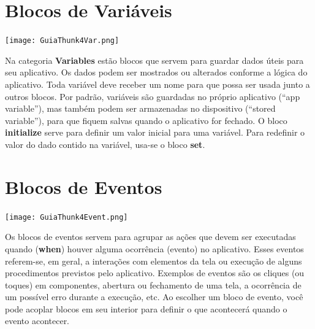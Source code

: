\documentclass[11pt,fleqn]{book} %
\begin{document}
\section{Blocos de Variáveis}

\begin{minipage}{0.5\textwidth}
	\texttt{[image: GuiaThunk4Var.png]}
\end{minipage}
\hfill
\begin{minipage}{0.45\textwidth}\raggedright
	Na categoria \textbf{Variables} estão blocos que servem para guardar dados úteis para seu aplicativo. Os dados podem ser mostrados ou alterados conforme a lógica do aplicativo. Toda variável deve receber um nome para que possa ser usada junto a outros blocos.
	Por padrão, variáveis são guardadas no próprio aplicativo (``app variable''), mas também podem ser armazenadas no dispositivo (``stored variable''), para que fiquem salvas quando o aplicativo for fechado.
	O bloco \textbf{initialize} serve para definir um valor
	inicial para uma variável. Para redefinir o valor do dado
	contido na variável, usa-se o bloco \textbf{set}. 
\end{minipage}


\section{Blocos de Eventos}

\begin{minipage}{0.5\textwidth}
	\texttt{[image: GuiaThunk4Event.png]}
\end{minipage}
\hfill
\begin{minipage}{0.45\textwidth}\raggedright
	Os blocos de eventos servem para agrupar as ações que devem ser executadas quando (\textbf{when}) houver alguma ocorrência (evento) no aplicativo. Esses eventos referem-se,
	em geral, a interações com elementos da tela ou execução
	de alguns procedimentos previstos pelo aplicativo.
	Exemplos de eventos são os cliques (ou toques) em 
	componentes, abertura ou fechamento de uma tela, a
	ocorrência de um possível erro durante a execução, etc.
	Ao escolher um bloco de evento, você pode acoplar blocos
	em seu interior para definir o que acontecerá quando
	o evento acontecer. 
\end{minipage}
\end{document}

